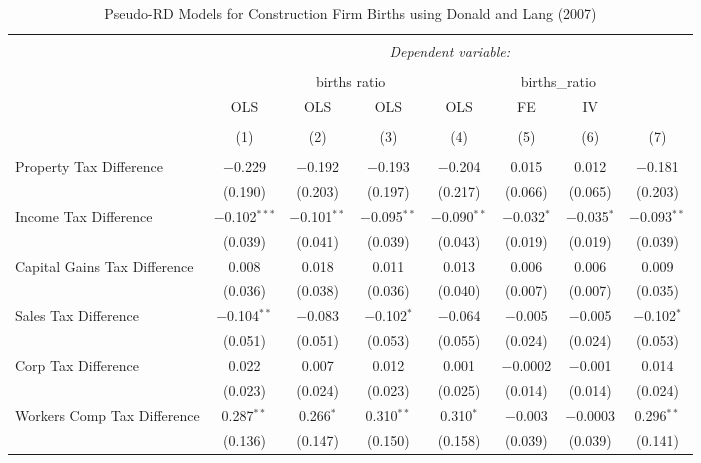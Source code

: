 
\begin{table}[!htbp] \centering 
  \caption{Pseudo-RD Models for  Construction Firm Births using Donald and Lang (2007)} 
  \label{} 
\begin{tabular}{@{\extracolsep{5pt}}lccccccc} 
\\[-1.8ex]\hline 
\hline \\[-1.8ex] 
 & \multicolumn{7}{c}{\textit{Dependent variable:}} \\ 
\cline{2-8} 
\\[-1.8ex] & \multicolumn{4}{c}{births ratio} & \multicolumn{2}{c}{births\_ratio} &   \\ 
 & OLS & OLS & OLS & OLS & FE & IV &  \\ 
\\[-1.8ex] & (1) & (2) & (3) & (4) & (5) & (6) & (7)\\ 
\hline \\[-1.8ex] 
 Property Tax Difference & $-$0.229 & $-$0.192 & $-$0.193 & $-$0.204 & 0.015 & 0.012 & $-$0.181 \\ 
  & (0.190) & (0.203) & (0.197) & (0.217) & (0.066) & (0.065) & (0.203) \\ 
  Income Tax Difference & $-$0.102$^{***}$ & $-$0.101$^{**}$ & $-$0.095$^{**}$ & $-$0.090$^{**}$ & $-$0.032$^{*}$ & $-$0.035$^{*}$ & $-$0.093$^{**}$ \\ 
  & (0.039) & (0.041) & (0.039) & (0.043) & (0.019) & (0.019) & (0.039) \\ 
  Capital Gains Tax Difference & 0.008 & 0.018 & 0.011 & 0.013 & 0.006 & 0.006 & 0.009 \\ 
  & (0.036) & (0.038) & (0.036) & (0.040) & (0.007) & (0.007) & (0.035) \\ 
  Sales Tax Difference & $-$0.104$^{**}$ & $-$0.083 & $-$0.102$^{*}$ & $-$0.064 & $-$0.005 & $-$0.005 & $-$0.102$^{*}$ \\ 
  & (0.051) & (0.051) & (0.053) & (0.055) & (0.024) & (0.024) & (0.053) \\ 
  Corp Tax Difference & 0.022 & 0.007 & 0.012 & 0.001 & $-$0.0002 & $-$0.001 & 0.014 \\ 
  & (0.023) & (0.024) & (0.023) & (0.025) & (0.014) & (0.014) & (0.024) \\ 
  Workers Comp Tax Difference & 0.287$^{**}$ & 0.266$^{*}$ & 0.310$^{**}$ & 0.310$^{*}$ & $-$0.003 & $-$0.0003 & 0.296$^{**}$ \\ 
  & (0.136) & (0.147) & (0.150) & (0.158) & (0.039) & (0.039) & (0.141) \\ 

\end{tabular}
\end{table}
